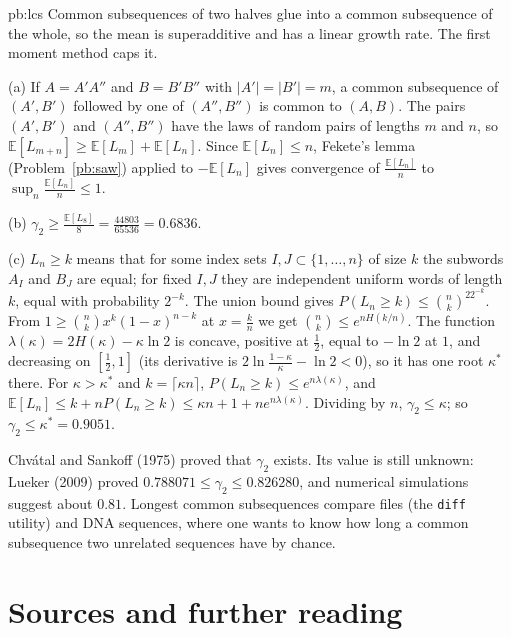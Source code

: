 \begin{solution}{pb:lcs}
\idea Common subsequences of two halves glue into a common subsequence of the whole, so the mean is superadditive and has a linear growth rate. The first moment
method caps it.

\writeup (a) If $A=A'A''$ and $B=B'B''$ with $|A'|=|B'|=m$, a common subsequence of $(A',B')$ followed by one of $(A'',B'')$ is common to $(A,B)$. The pairs $(A',B')$ and $(A'',B'')$ have the laws of
random pairs of lengths $m$ and $n$, so $\mathbb E[L_{m+n}]\ge\mathbb E[L_m]+\mathbb E[L_n]$. Since $\mathbb E[L_n]\le n$, Fekete's lemma (Problem~\ref{pb:saw}) applied to $-\mathbb E[L_n]$ gives convergence of $\frac{\mathbb E[L_n]}n$ to
$\sup_n\frac{\mathbb E[L_n]}n\le1$.

(b) $\gamma_2\ge\frac{\mathbb E[L_8]}8=\frac{44803}{65536}=0.6836$.

(c) $L_n\ge k$ means that for some index sets $I,J\subset\{1,\dots,n\}$ of size $k$ the subwords $A_I$ and $B_J$ are equal; for fixed $I,J$ they are independent uniform words of length $k$, equal with
probability $2^{-k}$. The union bound gives $P(L_n\ge k)\le\binom nk^22^{-k}$. From $1\ge\binom nkx^k(1-x)^{n-k}$ at $x=\frac kn$ we get $\binom nk\le e^{nH(k/n)}$. The function $\lambda(\kappa)=2H(\kappa)-\kappa\ln2$ is
concave, positive at $\frac12$, equal to $-\ln2$ at $1$, and decreasing on $[\frac12,1]$ (its derivative is $2\ln\frac{1-\kappa}\kappa-\ln2<0$), so it has one root $\kappa^*$ there. For $\kappa>\kappa^*$ and $k=\lceil\kappa n\rceil$,
$P(L_n\ge k)\le e^{n\lambda(\kappa)}$, and $\mathbb E[L_n]\le k+nP(L_n\ge k)\le\kappa n+1+ne^{n\lambda(\kappa)}$. Dividing by $n$, $\gamma_2\le\kappa$; so $\gamma_2\le\kappa^*=0.9051$.

\leads Chv\'atal and Sankoff (1975) proved that $\gamma_2$ exists. Its value is still unknown: Lueker (2009) proved $0.788071\le\gamma_2\le0.826280$, and numerical simulations suggest about
$0.81$. Longest common subsequences compare files (the \texttt{diff} utility) and DNA sequences, where one wants to know how long a common subsequence two unrelated
sequences have by chance.
\end{solution}

\section*{Sources and further reading}

